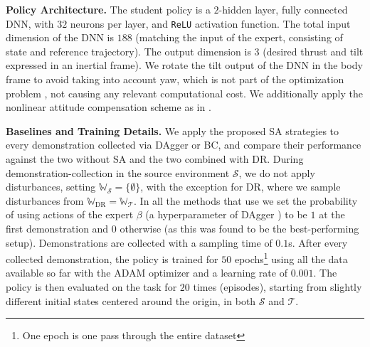 \noindent
\textbf{Policy Architecture.} The student policy is a $2$-hidden layer, fully connected \ac{DNN}, with $32$ neurons per layer, and \texttt{ReLU} activation function. The total input dimension of the \ac{DNN} is $188$ (matching the input of the expert, consisting of state and reference trajectory). The output dimension is $3$ (desired thrust and tilt expressed in an inertial frame). We rotate the tilt output of the \ac{DNN} in the body frame to avoid taking into account yaw, which is not part of the optimization problem \cite{kamel2017linear}, not causing any relevant computational cost. We additionally apply the nonlinear attitude compensation scheme as in \cite{kamel2017linear}.

\noindent
\textbf{Baselines and Training Details.} We apply the proposed \ac{SA} strategies to every demonstration collected via \ac{DAgger} or \ac{BC}, and compare their performance against the two without \ac{SA} and the two combined with \ac{DR}. 
During demonstration-collection in the source environment $\mathcal{S}$, we do not apply disturbances, setting $\mathbb{W}_\mathcal{S} = \{ \emptyset \}$, with the exception for \ac{DR}, where we sample disturbances from $\mathbb{W}_\text{DR} = \mathbb{W}_\mathcal{T}$. 
In all the methods that use  we set the probability of using actions of the expert $\beta$ (a hyperparameter of DAgger \cite{ross2011reduction}) to be $1$ at the first demonstration and $0$ otherwise (as this was found to be the best-performing setup).
Demonstrations are collected with a sampling time of $0.1$s. After every collected demonstration, the policy is trained for $50$ epochs\footnote{One epoch is one pass through the entire dataset} using all the data available so far with the ADAM \cite{kingma2014adam} optimizer and a learning rate of $0.001$. The policy is then evaluated on the task for $20$ times (episodes), starting from slightly different initial states centered around the origin, in both $\mathcal{S}$ and $\mathcal{T}$. 

